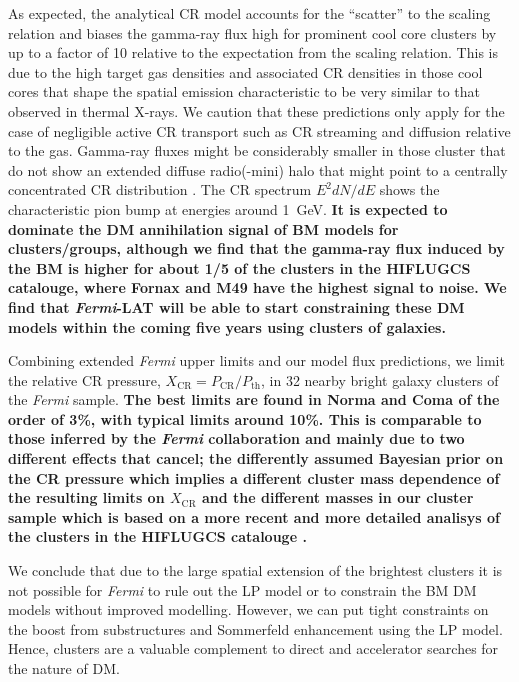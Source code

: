 \documentclass[10pt,aps,pra,reprint,amsmath,amsfonts,amssymb,showpacs,nofootinbib,floatfix]{revtex4-1}
\def\del#1{{}}
\def\C#1{{\bf #1}}
\newcommand{\Fermi}{{\em Fermi}\xspace}
\newcommand{\rmn}{\mathrm}
\newcommand{\CR}{\rmn{CR}}
\begin{document}
As expected, the analytical CR model accounts for the ``scatter'' to
the scaling relation and biases the gamma-ray flux high for prominent
cool core clusters by up to a factor of 10 relative to the expectation
from the scaling relation. This is due to the high target gas
densities and associated CR densities in those cool cores that shape
the spatial emission characteristic to be very similar to that
observed in thermal X-rays. We caution that these predictions only
apply for the case of negligible active CR transport such as CR
streaming and diffusion relative to the gas. Gamma-ray fluxes might be
considerably smaller in those cluster that do not show an extended
diffuse radio(-mini) halo that might point to a centrally concentrated
CR distribution \citep{2011A&A...527A..99E}. The CR spectrum $E^2
dN/dE$ shows the characteristic pion bump at energies around
1~GeV. \C{It is expected to dominate the DM annihilation signal of BM
  models for clusters/groups, although we find that the gamma-ray
  flux induced by the BM is higher for about 1/5 of the clusters in the
  HIFLUGCS catalouge, where Fornax and M49 have the highest signal to
  noise. We find that \Fermi-LAT will be able to start constraining
  these DM models within the coming five years using clusters of
  galaxies.} \del{It is expected to dominate the DM annihilation
  signal of BM models for all clusters/groups but Fornax.}

Combining extended \Fermi upper limits and our model flux predictions,
we limit the relative CR pressure, $X_\CR = P_\CR/P_\rmn{th}$, in 32
nearby bright galaxy clusters of the \Fermi sample. \C{The best limits
  are found in Norma and Coma of the order of 3\%, with typical limits
  around 10\%. This is comparable to those inferred by the \Fermi
  collaboration \citep{2010ApJ...717L..71A} and mainly due to two
  different effects that cancel; the differently assumed Bayesian
  prior on the CR pressure which implies a different cluster mass
  dependence of the resulting limits on $X_\CR$ and the different
  masses in our cluster sample which is based on a more recent and
  more detailed analisys of the clusters in the HIFLUGCS
  catalouge \cite{2007A&A...466..805C}.}

We conclude that due to the large spatial extension of the brightest
clusters it is not possible for \Fermi to rule out the LP model or to
constrain the BM DM models without improved modelling. However, we can
put tight constraints on the boost from substructures and Sommerfeld
enhancement using the LP model. Hence, clusters are a valuable
complement to direct and accelerator searches for the nature of DM.
\end{document}
